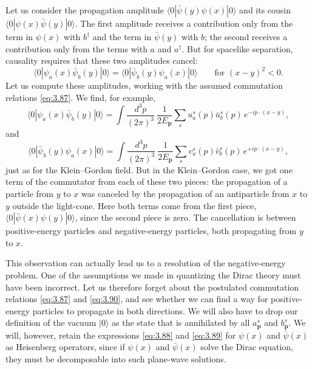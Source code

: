 Let us consider the propagation amplitude $\langle 0|\bar{\psi}(y)\psi(x)|0\rangle$
and its cousin $\langle 0|\psi(x)\bar{\psi}(y)|0\rangle$.  The first
amplitude receives a contribution only from the term in $\psi(x)$ with $b^\dagger$
and the term in $\bar{\psi}(y)$ with $b$; the second receives a contribution
only from the terms with $a$ and $a^\dagger$.  But for spacelike separation,
causality requires that these two amplitudes cancel:
\begin{equation}
  \langle 0|\psi_a(x)\bar{\psi}_b(y)|0\rangle
  = \langle 0|\bar{\psi}_b(y)\psi_a(x)|0\rangle
  \qquad\text{for } (x-y)^2<0 .
  \label{eq:3.91}
\end{equation}
Let us compute these amplitudes, working with the assumed commutation
relations \eqref{eq:3.87}.  We find, for example,
\begin{equation}
  \langle 0|\psi_a(x)\bar{\psi}_b(y)|0\rangle =
    \int \frac{d^3p}{(2\pi)^3}\ \frac{1}{2E_{\mathbf{p}}}
    \sum_s u_a^s(p)\bar{u}_b^s(p)\, e^{-ip\cdot(x-y)},
  \label{eq:3.92}
\end{equation}
and
\begin{equation}
  \langle 0|\bar{\psi}_b(y)\psi_a(x)|0\rangle =
    \int \frac{d^3p}{(2\pi)^3}\ \frac{1}{2E_{\mathbf{p}}}
    \sum_s v_a^s(p)\bar{v}_b^s(p)\, e^{+ip\cdot(x-y)},
  \label{eq:3.93}
\end{equation}
just as for the Klein--Gordon field.  But in the Klein--Gordon case, we got
one term of the commutator from each of these two pieces: the propagation of
a particle from $y$ to $x$ was canceled by the propagation of an antiparticle
from $x$ to $y$ outside the light-cone.  Here both terms come from the first
piece, $\langle 0|\bar{\psi}(x)\psi(y)|0\rangle$, since the second piece is
zero.  The cancellation is between positive-energy particles and
negative-energy particles, both propagating from $y$ to $x$.

This observation can actually lead us to a resolution of the negative-energy
problem.  One of the assumptions we made in quantizing the Dirac theory must
have been incorrect.  Let us therefore forget about the postulated
commutation relations \eqref{eq:3.87} and \eqref{eq:3.90}, and see whether we
can find a way for positive-energy particles to propagate in both directions.
We will also have to drop our definition of the vacuum $|0\rangle$ as the
state that is annihilated by all $a_{\mathbf{p}}^s$ and $b_{\mathbf{p}}^s$.
We will, however, retain the expressions \eqref{eq:3.88} and \eqref{eq:3.89}
for $\psi(x)$ and $\bar{\psi}(x)$ as Heisenberg operators, since if
$\psi(x)$ and $\bar{\psi}(x)$ solve the Dirac equation, they must be
decomposable into such plane-wave solutions.

